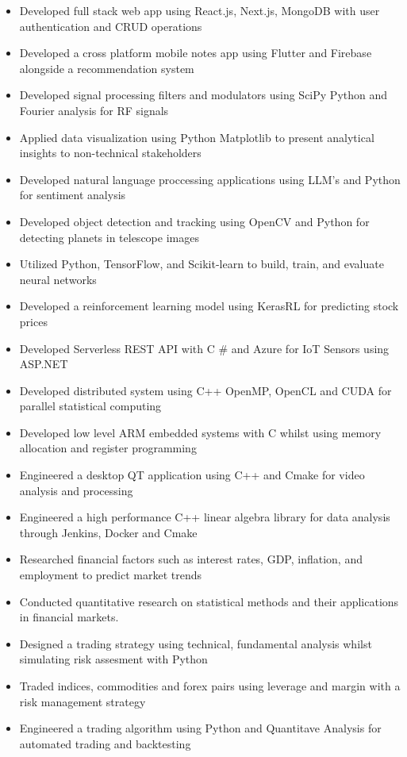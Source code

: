 \documentclass[11pt,a4paper,ragged2e]{altacv}
\begin{document}
\begin{paracol}{1}
\begin{itemize}
\item Developed full stack web app using React.js, Next.js, MongoDB with user authentication and CRUD operations
\item Developed a cross platform mobile notes app using Flutter and Firebase alongside a recommendation system
\item Developed signal processing filters and modulators using SciPy Python and Fourier analysis for RF signals 
\item Applied data visualization using Python Matplotlib to present analytical insights to non-technical stakeholders
\item Developed natural language proccessing applications using LLM's and Python for sentiment analysis
\item Developed object detection and tracking using OpenCV and Python for detecting planets in telescope images
\item Utilized Python, TensorFlow, and Scikit-learn to build, train, and evaluate neural networks
\item Developed a reinforcement learning model using KerasRL for predicting stock prices
\item Developed Serverless REST API with C \# and Azure for IoT Sensors using ASP.NET 
\item Developed distributed system using C++ OpenMP, OpenCL and CUDA for parallel statistical computing
\item Developed low level ARM embedded systems with C whilst using memory allocation and register programming
\item Engineered a desktop QT application using C++ and Cmake for video analysis and processing
\item Engineered a high performance C++ linear algebra library for data analysis through Jenkins, Docker and Cmake
\end{itemize}
\tightdivider

\begin{itemize}
\item Researched financial factors such as interest rates, GDP, inflation, and employment to predict market trends
\item Conducted quantitative research on statistical methods and their applications in financial markets.
\item Designed a trading strategy using technical, fundamental analysis whilst simulating risk assesment with Python
\item Traded indices, commodities and forex pairs using leverage and margin with a risk management strategy 
\item Engineered a trading algorithm using Python and Quantitave Analysis for automated trading and backtesting
\end{itemize}
\tightdivider


\end{paracol}
\end{document}
